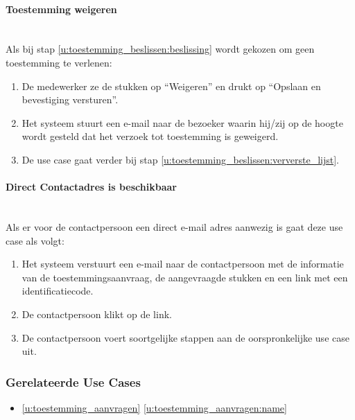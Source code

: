 \documentclass[a4paper,titlepage]{report}
\def\namedref#1{\ref{#1} \ref{#1:name}}
\begin{document}
        \paragraph{Toestemming weigeren}\hfill\\
          Als bij stap \ref{u:toestemming_beslissen:beslissing} wordt gekozen
          om geen toestemming te verlenen:
          \begin{enumerate}
            \item De medewerker ze de stukken op ``Weigeren'' en drukt op
              ``Opslaan en bevestiging versturen''.
            \item Het systeem stuurt een e-mail naar de bezoeker waarin
              hij/zij op de hoogte wordt gesteld dat het verzoek tot
              toestemming is geweigerd.
            \item De use case gaat verder bij stap
              \ref{u:toestemming_beslissen:ververste_lijst}.
          \end{enumerate}
        \paragraph{Direct Contactadres is beschikbaar}\hfill\\
          Als er voor de contactpersoon een direct e-mail adres aanwezig is
          gaat deze use case als volgt:
          \begin{enumerate}
            \item Het systeem verstuurt een e-mail naar de contactpersoon met
              de informatie van de toestemmingsaanvraag, de aangevraagde
              stukken en een link met een identificatiecode.
            \item De contactpersoon klikt op de link.
            \item De contactpersoon voert soortgelijke stappen aan de
              oorspronkelijke use case uit.
          \end{enumerate}
      \subsubsection{Gerelateerde Use Cases}
        \begin{itemize}
          \item \namedref{u:toestemming_aanvragen}
        \end{itemize}
\end{document}
